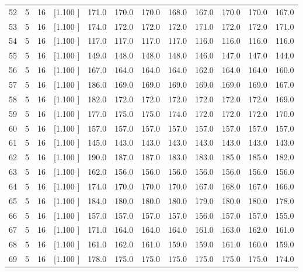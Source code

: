 \documentclass[12pt,a4paper]{article}
\begin{document}
\begin{center}
{\begin{tabular}{r r r r r r r r r r r r}
  52&  5& 16&[1.100     ]&   171.0&   170.0&   170.0&   168.0&   167.0&   170.0&   170.0&   167.0\\[-0.02in]
  53&  5& 16&[1.100     ]&   174.0&   172.0&   172.0&   172.0&   171.0&   172.0&   172.0&   171.0\\[-0.02in]
  54&  5& 16&[1.100     ]&   117.0&   117.0&   117.0&   117.0&   116.0&   116.0&   116.0&   116.0\\[-0.02in]
  55&  5& 16&[1.100     ]&   149.0&   148.0&   148.0&   148.0&   146.0&   147.0&   147.0&   144.0\\[-0.02in]
  56&  5& 16&[1.100     ]&   167.0&   164.0&   164.0&   164.0&   162.0&   164.0&   164.0&   160.0\\[-0.02in]
  57&  5& 16&[1.100     ]&   186.0&   169.0&   169.0&   169.0&   169.0&   169.0&   169.0&   167.0\\[-0.02in]
  58&  5& 16&[1.100     ]&   182.0&   172.0&   172.0&   172.0&   172.0&   172.0&   172.0&   169.0\\[-0.02in]
  59&  5& 16&[1.100     ]&   177.0&   175.0&   175.0&   174.0&   172.0&   172.0&   172.0&   170.0\\[-0.02in]
  60&  5& 16&[1.100     ]&   157.0&   157.0&   157.0&   157.0&   157.0&   157.0&   157.0&   157.0\\[-0.02in]
  61&  5& 16&[1.100     ]&   145.0&   143.0&   143.0&   143.0&   143.0&   143.0&   143.0&   143.0\\[-0.02in]
  62&  5& 16&[1.100     ]&   190.0&   187.0&   187.0&   183.0&   183.0&   185.0&   185.0&   182.0\\[-0.02in]
  63&  5& 16&[1.100     ]&   162.0&   156.0&   156.0&   156.0&   156.0&   156.0&   156.0&   156.0\\[-0.02in]
  64&  5& 16&[1.100     ]&   174.0&   170.0&   170.0&   170.0&   167.0&   168.0&   167.0&   166.0\\[-0.02in]
  65&  5& 16&[1.100     ]&   184.0&   180.0&   180.0&   180.0&   179.0&   180.0&   180.0&   178.0\\[-0.02in]
  66&  5& 16&[1.100     ]&   157.0&   157.0&   157.0&   157.0&   156.0&   157.0&   157.0&   155.0\\[-0.02in]
  67&  5& 16&[1.100     ]&   171.0&   164.0&   164.0&   164.0&   161.0&   163.0&   162.0&   161.0\\[-0.02in]
  68&  5& 16&[1.100     ]&   161.0&   162.0&   161.0&   159.0&   159.0&   161.0&   160.0&   159.0\\[-0.02in]
  69&  5& 16&[1.100     ]&   178.0&   175.0&   175.0&   175.0&   175.0&   175.0&   175.0&   174.0\\[-0.02in]

\end{tabular}}
\end{center}
\end{document}
